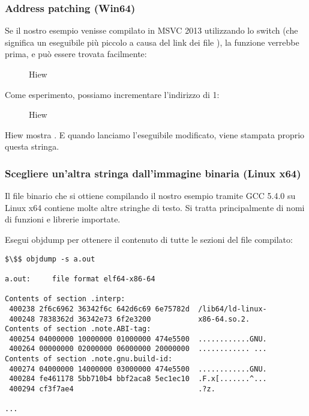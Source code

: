 \subsubsection{Address patching (Win64)}

Se il nostro esempio venisse compilato in MSVC 2013 utilizzando lo switch 
(che significa un eseguibile più piccolo a causa del link dei file ), la funzione \main verrebbe prima, e può essere trovata facilmente:

\begin{figure}[H]
\centering
{}
\caption{Hiew}
\label{}
\end{figure}

Come esperimento, possiamo \gls{incrementare} l'indirizzo di 1:

\begin{figure}[H]
\centering
{}
\caption{Hiew}
\label{}
\end{figure}

Hiew mostra .
E quando lanciamo l'eseguibile modificato, viene stampata proprio questa stringa.

\subsubsection{Scegliere un'altra stringa dall'immagine binaria (Linux x64)}

Il file binario che si ottiene compilando il nostro esempio tramite GCC 5.4.0 su Linux x64 contiene molte altre stringhe di testo.
Si tratta principalmente di nomi di funzioni e librerie importate.

Esegui objdump per ottenere il contenuto di tutte le sezioni del file compilato:

\begin{lstlisting}[basicstyle=\ttfamily, mathescape]
$\$$ objdump -s a.out

a.out:     file format elf64-x86-64

Contents of section .interp:
 400238 2f6c6962 36342f6c 642d6c69 6e75782d  /lib64/ld-linux-
 400248 7838362d 36342e73 6f2e3200           x86-64.so.2.
Contents of section .note.ABI-tag:
 400254 04000000 10000000 01000000 474e5500  ............GNU.
 400264 00000000 02000000 06000000 20000000  ............ ...
Contents of section .note.gnu.build-id:
 400274 04000000 14000000 03000000 474e5500  ............GNU.
 400284 fe461178 5bb710b4 bbf2aca8 5ec1ec10  .F.x[.......^...
 400294 cf3f7ae4                             .?z.

...
\end{lstlisting}

